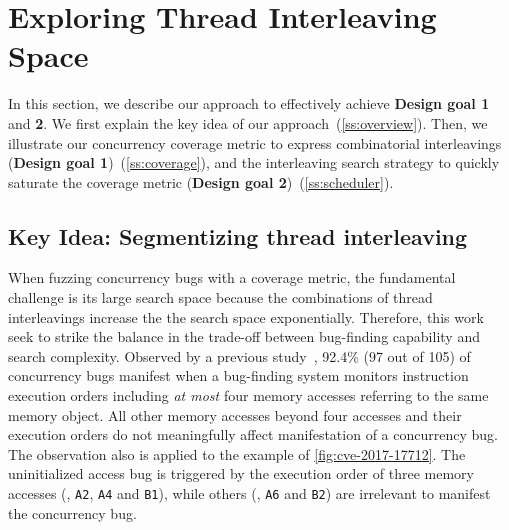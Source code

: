 \section{Exploring Thread Interleaving Space}
\label{s:design}

In this section, we describe our approach to effectively achieve
\textbf{Design goal 1} and \textbf{2}.
%
We first explain the key idea of our approach~(\autoref{ss:overview}). 
Then, we illustrate our concurrency
coverage metric to express combinatorial interleavings 
(\textbf{Design goal 1})~(\autoref{ss:coverage}), and the interleaving search strategy
to quickly saturate the coverage metric (\textbf{Design goal 2})~(\autoref{ss:scheduler}).


\subsection{Key Idea: Segmentizing thread interleaving}
\label{ss:overview}



When fuzzing concurrency bugs with a coverage metric, the fundamental
challenge is its large search space because the combinations of thread
interleavings increase the the search space exponentially.
%
Therefore, this work seek to strike the balance in the trade-off
between bug-finding capability and search complexity.
%
Observed by a previous study~\cite{learningfrommistakes}, 92.4\% (97
out of 105) of concurrency bugs manifest when a bug-finding system
monitors instruction execution orders including \textit{at most} four
memory accesses referring to the same memory object.
%
All other memory accesses beyond four accesses and their execution
orders do not meaningfully affect manifestation of a concurrency bug.
The observation also is applied to the example of
\autoref{fig:cve-2017-17712}. The uninitialized access bug is
triggered by the execution order of three memory accesses (\eg,
\texttt{A2}, \texttt{A4} and \texttt{B1}), while others (\eg,
\texttt{A6} and \texttt{B2}) are irrelevant to manifest the
concurrency bug.


